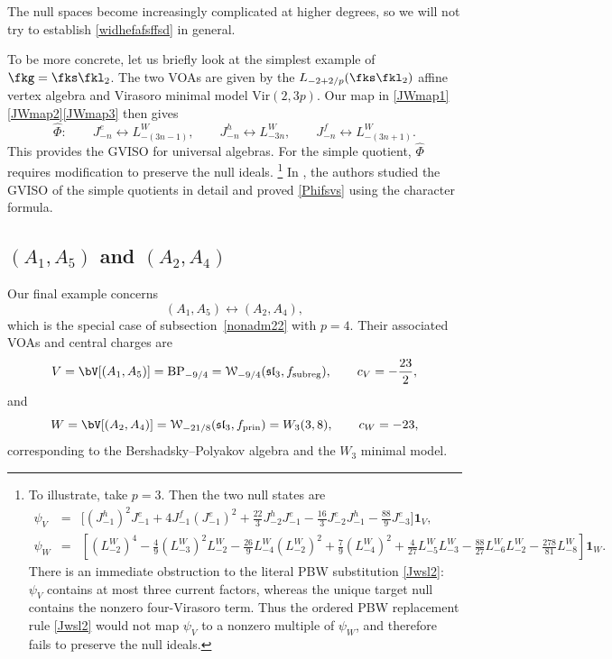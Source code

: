 \documentclass[a4paper,11pt]{article}
\theoremstyle{definition}
\theoremstyle{definition}
\theoremstyle{remark}
\newcommand{\be}{\begin{equation}}
\newcommand{\ee}{\end{equation}}
\newcommand{\beqn}{\begin{eqnarray}}
\newcommand{\eeqn}{\end{eqnarray}}
\begin{document}
The null spaces become increasingly complicated at higher degrees, so we will not try to establish \eqref{widhefafsffsd} in general. 
  
 

To be more concrete, let us briefly look at  the simplest example of $\fkg=\fks\fkl_2$.  The two VOAs are given by the $L_{-2+2/p}(\fks\fkl_2)$ affine vertex algebra and Virasoro minimal model $\text{Vir}(2,3p)$. Our   map   in \eqref{JWmap1}\eqref{JWmap2}\eqref{JWmap3} then gives 
\be\label{Jwsl2}
\widehat \Phi:\qquad
J^e_{-n}\longleftrightarrow L^W_{-(3n-1)},\qquad
J^h_{-n}\longleftrightarrow L^W_{-3n},\qquad
J^f_{-n}\longleftrightarrow L^W_{-(3n+1)}.
\ee
 This provides the GVISO for universal algebras. For the simple quotient, $\widehat \Phi$ requires  modification to preserve the null ideals. 
 \footnote{To illustrate, take $p=3$. Then the two null states are 
 \beqn\nonumber
\psi_V&=&\Big[
 (J^h_{-1})^2J^e_{-1}
+4J^f_{-1}(J^e_{-1})^2
+\frac{22}{3}J^h_{-2}J^e_{-1} -\frac{16}{3}J^e_{-2}J^h_{-1}
-\frac{88}{9}J^e_{-3}
\Big] \bm 1_V,
\\ \nonumber
\psi_W&=&\left[
 (L^W_{-2})^4
-\frac{4}{9}(L^W_{-3})^2 L^W_{-2}
-\frac{26}{9}L^W_{-4}(L^W_{-2})^2
+\frac{7}{9}(L^W_{-4})^2 
+\frac{4}{27}L^W_{-5}L^W_{-3}
-\frac{88}{27}L^W_{-6}L^W_{-2}
-\frac{278}{81}L^W_{-8}
\right] \bm 1_W .
\eeqn
There is an immediate obstruction to the literal PBW substitution \eqref{Jwsl2}: $ \psi_V$ contains at most three current factors, whereas the unique target null contains the nonzero four-Virasoro term. Thus the ordered PBW replacement rule  \eqref{Jwsl2} would not  map $ \psi_V$ to a nonzero multiple of $ \psi_W$, and therefore  fails to preserve the null ideals.
}
%
   In   \cite{Adamovic:2025efe}, the authors studied  the GVISO  of the simple quotients in detail and proved \eqref{Phifsvs} using the  character formula. 
  


 \subsection{$(A_1,A_5)$ and $(A_2,A_4)$}
Our final example concerns 
\be
(A_1,A_5)\longleftrightarrow(A_2,A_4),
\ee
which is the  special case of subsection~\ref{nonadm22} with $p=4$.   
Their associated VOAs and central charges are 
\be
V=\bV[(A_1,A_5)]= {\text{BP}}_{-9/4}
=
\mathcal W_{-9/4}(\mathfrak{sl}_3,f_{\mathrm{subreg}}), \qquad
c_V=-\frac{23}{2},
\ee
and
\be
W =\bV[(A_2,A_4)]=\mathcal W_{-21/8}(\mathfrak{sl}_3,f_{\mathrm{prin}})
=W_3(3,8), \qquad c_W=-23,
\ee
corresponding to the Bershadsky--Polyakov  algebra and the $W_3$ minimal model.
\end{document}
